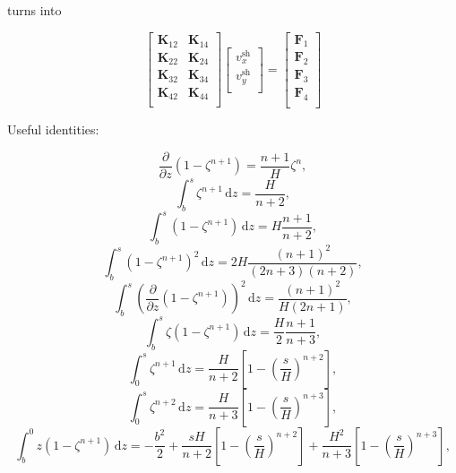 \documentclass{amsart}
\begin{document}
turns into

\begin{equation*}
 \left[
\begin{array}{cc}
\mathbf{K}_{12} & \mathbf{K}_{14} \\
\mathbf{K}_{22} & \mathbf{K}_{24} \\
\mathbf{K}_{32} & \mathbf{K}_{34} \\
\mathbf{K}_{42} & \mathbf{K}_{44} \\
\end{array} \right]
 \left[
\begin{array}{c}
    v^{\mathrm{sh}}_x \\
    v^{\mathrm{sh}}_y \\
\end{array}
\right]
 = 
 \left[
   \begin{array}{c}
     \mathbf{F}_1 \\
     \mathbf{F}_2 \\
     \mathbf{F}_3 \\
     \mathbf{F}_4 \\
\end{array}
\right]
\end{equation*}


Useful identities:

\begin{equation}
  \frac{\partial}{\partial z} \left(1-\zeta^{n+1}\right) = \frac{n+1}{H} \zeta^n,
\end{equation}
\begin{equation}
  \int_b^s \zeta^{n+1}\,\mathrm{d}z = \frac{H}{n+2},
\end{equation}
\begin{equation}
  \int_b^s \left(1-\zeta^{n+1}\right) \,\mathrm{d}z = H\frac{n+1}{n+2},
\end{equation}
\begin{equation}
  \int_b^s \left(1-\zeta^{n+1}\right)^2 \,\mathrm{d}z = 2H\frac{(n+1)^2}{(2n+3)(n+2)},
\end{equation}
\begin{equation}
  \int_b^s \left(\frac{\partial}{\partial z}\left(1-\zeta^{n+1}\right)\right)^2 \,\mathrm{d}z = \frac{(n+1)^2}{H(2n+1)},
\end{equation}
\begin{equation}
  \int_b^s \zeta\left(1-\zeta^{n+1}\right) \,\mathrm{d}z = \frac{H}{2}\frac{n+1}{n+3},
\end{equation}
\begin{equation}
  \int_0^s \zeta^{n+1}\,\mathrm{d}z = \frac{H}{n+2}\left[1-\left(\frac{s}{H}\right)^{n+2}\right],
\end{equation}
\begin{equation}
  \int_0^s \zeta^{n+2}\,\mathrm{d}z = \frac{H}{n+3}\left[1-\left(\frac{s}{H}\right)^{n+3}\right],
\end{equation}
\begin{equation}
  \int_b^0 z\left(1-\zeta^{n+1}\right)\,\mathrm{d}z = -\frac{b^2}{2} + \frac{sH}{n+2} \left[ 1 - \left(\frac{s}{H}\right)^{n+2}\right] + \frac{H^2}{n+3} \left[ 1- \left( \frac{s}{H}\right)^{n+3}\right],
\end{equation}
\end{document}
